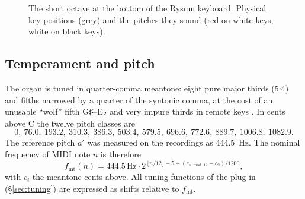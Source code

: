 \documentclass[11pt,a4paper,parskip=half,DIV=11,toc=bibliography]{scrartcl}
\begin{document}
\begin{figure}[h]
\centering
{}
\caption{The short octave at the bottom of the Rysum keyboard. Physical key positions (grey)
and the pitches they sound (red on white keys, white on black keys).}
\label{fig:shortoctave}
\end{figure}

\subsection{Temperament and pitch}
The organ is tuned in quarter-comma meantone: eight pure major thirds (5:4) and fifths narrowed by a
quarter of the syntonic comma, at the cost of an unusable \enquote{wolf} fifth G♯--E♭ and very
impure thirds in remote keys \citep{barbour1951}. In cents above C the twelve pitch classes are
\[
0,\ 76.0,\ 193.2,\ 310.3,\ 386.3,\ 503.4,\ 579.5,\ 696.6,\ 772.6,\ 889.7,\ 1006.8,\ 1082.9 .
\]
The reference pitch $a'$ was measured on the recordings as \SI{444.5}{Hz}. The nominal frequency of
MIDI note $n$ is therefore
\begin{equation}
  f_\text{mt}(n) = 444.5\,\text{Hz}\cdot 2^{\,\lfloor n/12\rfloor - 5 + \left(c_{n \bmod 12} - c_9\right)/1200},
  \label{eq:meantone}
\end{equation}
with $c_i$ the meantone cents above. All tuning functions of the plug-in (\S\ref{sec:tuning}) are
expressed as shifts relative to $f_\text{mt}$.
\end{document}
